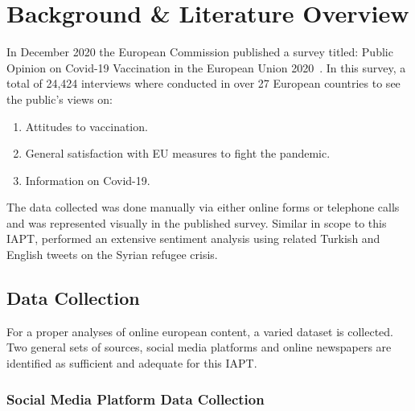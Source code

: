 \chapter{Background \& Literature Overview}

In December 2020 the European Commission published a survey titled: Public Opinion on Covid-19 Vaccination in the European Union 2020~\citep{eupublicopinion}.
In this survey, a total of 24,424 interviews where conducted in over 27 European countries to see the public's views on:

\begin{enumerate}
  \item Attitudes to vaccination.
  \item General satisfaction with EU measures to fight the pandemic.
  \item Information on Covid-19.
\end{enumerate}
\noindent The data collected was done manually via either online forms or telephone calls and was represented visually in the published survey.
Similar in scope to this \ac{IAPT}, \citet{ztrk2018} performed an extensive sentiment analysis using related Turkish and English tweets on the Syrian refugee crisis.


\section{Data Collection}

For a proper analyses of online european content, a varied dataset is collected.
Two general sets of sources, social media platforms and online newspapers are identified as sufficient and adequate for this \ac{IAPT}.

\subsection{Social Media Platform Data Collection}

